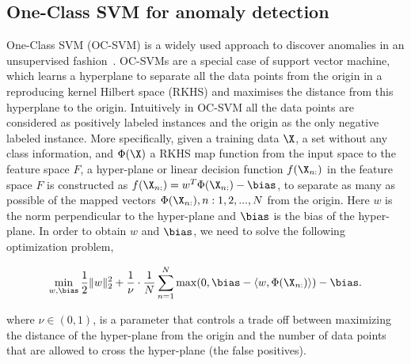 \subsection{One-Class SVM for anomaly detection}
\label{sec:ocsvm}

One-Class SVM (OC-SVM) is a widely used approach to discover anomalies in an unsupervised fashion~\cite{scholkopf2002support}. OC-SVMs are a special case of support vector machine, which learns a  hyperplane to separate all the data points from the origin in a reproducing kernel Hilbert space (RKHS) and maximises the distance from this hyperplane to the origin. Intuitively in OC-SVM all the data points are considered as positively labeled instances and the origin
as the only negative labeled instance. More specifically, given a training data $\X$, a set without any class information, and $\Phi(\X)$  a RKHS map function
from the input space to the feature space $F$,  a
hyper-plane or linear decision function $f(\X_{n :})$ in the feature space $F$ is constructed as
$f( \X_{n :} ) = w^T \Phi(\X_{n :}) - \bias$,  to separate as many as possible of the mapped vectors
${ \Phi(\X_{n :}), n: 1,2,...,N}$ from the origin. Here  $w$ is the norm perpendicular to the hyper-plane and $\bias$ is the bias of the hyper-plane. In order to
obtain $w$ and $\bias$, we need to solve the
following optimization problem,

\begin{equation}
\label{eqn:ocsvm-objective}
 \min_{w,\bias} \frac{1}{2} \| w \|_{2}^2+ \frac{1}{\nu} \cdot \frac{1}{N} \sum_{n = 1}^N \max( 0, \bias - \langle w, \Phi(\X_{n :}) \rangle ) - \bias.
\end{equation}

where $\nu \in (0,1)$, is a parameter that
controls a trade off between maximizing the distance of the
hyper-plane from the origin and the number of data points
that are allowed to cross the hyper-plane (the false positives).



